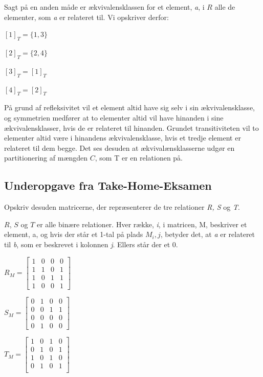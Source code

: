 \documentclass{article}
\begin{document}
Sagt på en anden måde er ækvivalensklassen for et element, \emph{a}, i $R$ alle de elementer, som \emph{a} er relateret til. Vi opskriver derfor:

\begin{center}
$[1]_T = \{1, 3\}$ \par
$[2]_T = \{2, 4\}$ \par 
$[3]_T = [1]_T$ \par
$[4]_T = [2]_T$
\end{center}

På grund af refleksivitet vil et element altid have sig selv i sin ækvivalensklasse, og symmetrien medfører at to elementer altid vil have hinanden i sine ækvivalensklasser, hvis de er relateret til hinanden. Grundet transitiviteten vil to elementer altid være i hinandens ækvivalensklasse, hvis et tredje element er relateret til dem begge.
Det ses desuden at ækvivalænsklasserne udgør en partitionering af mængden $C$, som T er en relationen på.

\subsection{Underopgave fra Take-Home-Eksamen}
\begin{center}
Opskriv desuden matricerne, der repræsenterer de tre relationer \emph{R, S} og \emph{T}.
\end{center}

$R$, $S$ og $T$ er alle binære relationer. Hver række, \emph{i}, i matricen, M, beskriver et element, a, og hvis der står et 1-tal på plads $M_i,j$, betyder det, at \emph{a} er relateret til \emph{b}, som er beskrevet i kolonnen \emph{j}. Ellers står der et 0.

\begin{center}
\begin{math}
R_M = \begin{bmatrix}
1 & 0 & 0 & 0 \\
1 & 1 & 0 & 1 \\
1 & 0 & 1 & 1 \\
1 & 0 & 0 & 1 
\end{bmatrix} 
\end{math}\par 
\begin{math}
S_M = \begin{bmatrix}
0 & 1 & 0 & 0 \\
0 & 0 & 1 & 1 \\
0 & 0 & 0 & 0 \\
0 & 1 & 0 & 0 
\end{bmatrix}
\end{math} \par 
\begin{math}
T_M = \begin{bmatrix}
1 & 0 & 1 & 0 \\
0 & 1 & 0 & 1 \\
1 & 0 & 1 & 0 \\
0 & 1 & 0 & 1 \\
\end{bmatrix}
\end{math}
\end{center}
\end{document}
